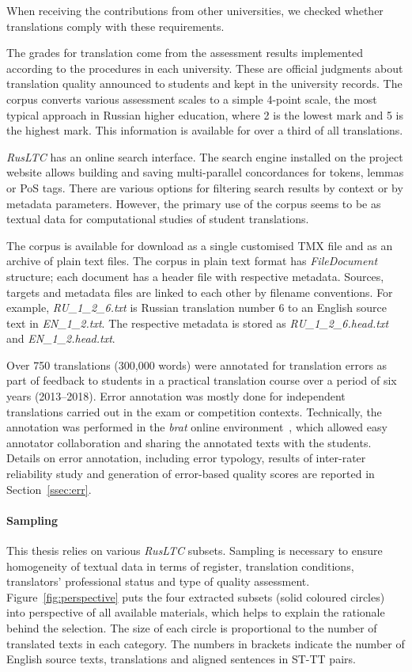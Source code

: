 When receiving the contributions from other universities, we checked whether translations comply with these requirements.

The grades for translation come from the assessment results implemented according to the procedures in each university. These are official judgments about translation quality announced to students and kept in the university records. The corpus converts various assessment scales to a simple 4-point scale, the most typical approach in Russian higher education, where 2 is the lowest mark and 5 is the highest mark. This information is available for over a third of all translations. 

\textit{RusLTC} has an online search interface. The search engine installed on the project website allows building and saving multi-parallel concordances for tokens, lemmas or PoS tags. There are various options for filtering search results by context or by metadata parameters. However, the primary use of the corpus seems to be as textual data for computational studies of student translations.

The corpus is available for download as a single customised TMX file and as an archive of plain text files. The corpus in plain text format has \textit{FileDocument} structure; each document has a header file with respective metadata. Sources, targets and metadata files are linked to each other by filename conventions. For example, \textit{RU\_1\_2\_6.txt} is Russian translation number 6 to an English source text in \textit{EN\_1\_2.txt}. The respective metadata is stored as \textit{RU\_1\_2\_6.head.txt} and \textit{EN\_1\_2.head.txt}.

Over 750 translations (300,000 words) were annotated for translation errors as part of feedback to students in a practical translation course over a period of six years (2013--2018). Error annotation was mostly done for independent translations carried out in the exam or competition contexts. Technically, the annotation was performed in the \textit{brat} online environment~\cite{Stenetorp2012}, which allowed easy annotator collaboration and sharing the annotated texts with the students. Details on error annotation, including error typology, results of inter-rater reliability study and generation of error-based quality scores are reported in Section~\ref{ssec:err}.

\paragraph{Sampling} This thesis relies on various \textit{RusLTC} subsets. Sampling is necessary to ensure homogeneity of textual data in terms of register, translation conditions, translators' professional status and type of quality assessment. Figure~\ref{fig:perspective} puts the four extracted subsets (solid coloured circles) into perspective of all available materials, which helps to explain the rationale behind the selection.
The size of each circle is proportional to the number of translated texts in each category. The numbers in brackets indicate the number of English source texts, translations and aligned sentences in ST-TT pairs. 


